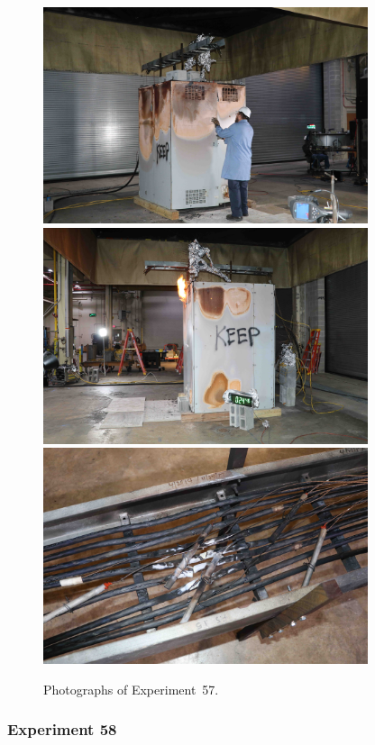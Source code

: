 \begin{figure}[p]
\centering
\includegraphics[height=2.50in]{../FIGURES/Test_57_setup} \\
\includegraphics[height=2.50in]{../FIGURES/Test_57_24_min_46_s} \\
\includegraphics[height=2.50in]{../FIGURES/Test_57_scar}
\caption[Photographs of Experiment~57]{Photographs of Experiment~57.}
\label{fig:Test_57_photos}
\end{figure}


\clearpage

\subsubsection{Experiment 58}

